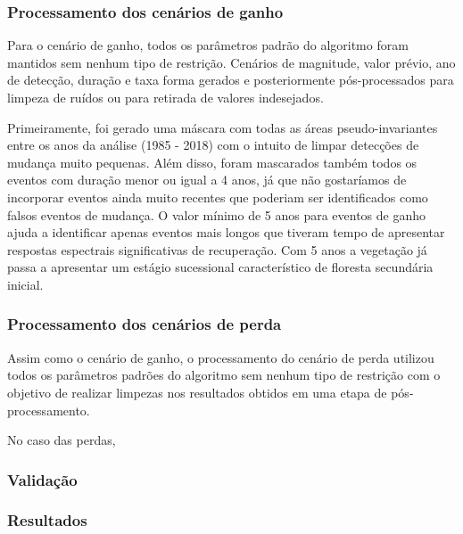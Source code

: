 \documentclass[12pt,a4paper]{article}
\begin{document}
\subsubsection{Processamento dos cenários de ganho}
\hspace{13pt} Para o cenário de ganho, todos os parâmetros padrão do algoritmo foram mantidos sem nenhum tipo de restrição. Cenários de magnitude, valor prévio, ano de detecção, duração e taxa forma gerados e posteriormente pós-processados para limpeza de ruídos ou para retirada de valores indesejados. 

Primeiramente, foi gerado uma máscara com todas as áreas pseudo-invariantes entre os anos da análise (1985 - 2018) com o intuito de limpar detecções de mudança muito pequenas. Além disso, foram mascarados também todos os eventos com duração menor ou igual a 4 anos, já que não gostaríamos de incorporar eventos ainda muito recentes que poderiam ser identificados como falsos eventos de mudança. O valor mínimo de 5 anos para eventos de ganho ajuda a identificar apenas eventos mais longos que tiveram tempo de apresentar respostas espectrais significativas de recuperação. Com 5 anos a vegetação já passa a apresentar um estágio sucessional característico de floresta secundária inicial. 

\subsubsection{Processamento dos cenários de perda}
\hspace{13pt} Assim como o cenário de ganho, o processamento do cenário de perda utilizou todos os parâmetros padrões do algoritmo sem nenhum tipo de restrição com o objetivo de realizar limpezas nos resultados obtidos em uma etapa de pós-processamento.

No caso das perdas, 

\subsubsection{Validação}

\subsubsection{Resultados}


\newpage

%

\end{document}

